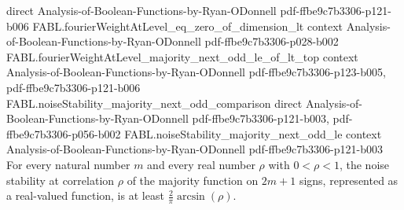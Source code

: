 \begin{theorem}
  {direct}
  {Analysis-of-Boolean-Functions-by-Ryan-ODonnell}
  {pdf-ffbe9c7b3306-p121-b006}
\proofstep
  {FABL.fourierWeightAtLevel_eq_zero_of_dimension_lt}
  {context}
  {Analysis-of-Boolean-Functions-by-Ryan-ODonnell}
  {pdf-ffbe9c7b3306-p028-b002}
\proofstep
  {FABL.fourierWeightAtLevel_majority_next_odd_le_of_lt_top}
  {context}
  {Analysis-of-Boolean-Functions-by-Ryan-ODonnell}
  {pdf-ffbe9c7b3306-p123-b005,
    pdf-ffbe9c7b3306-p121-b006}
\proofstep
  {FABL.noiseStability_majority_next_odd_comparison}
  {direct}
  {Analysis-of-Boolean-Functions-by-Ryan-ODonnell}
  {pdf-ffbe9c7b3306-p121-b003,
    pdf-ffbe9c7b3306-p056-b002}
\proofstep
  {FABL.noiseStability_majority_next_odd_le}
  {context}
  {Analysis-of-Boolean-Functions-by-Ryan-ODonnell}
  {pdf-ffbe9c7b3306-p121-b003}
For every natural number $m$ and every real number $\rho$ with $0<\rho<1$, the noise
stability at correlation $\rho$ of the majority function on $2m+1$ signs, represented as
a real-valued function, is at least $\frac{2}{\pi}\arcsin(\rho)$.
\end{theorem}

